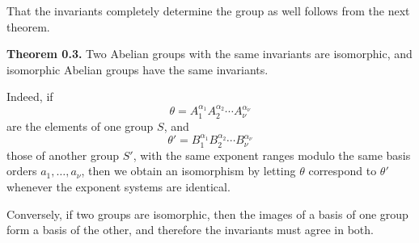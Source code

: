 \documentclass[11pt]{article}
\begin{document}
That the invariants completely determine the group as well follows from the next theorem.

\medskip
\noindent\textbf{Theorem 0.3.}
Two Abelian groups with the same invariants are isomorphic, and isomorphic Abelian groups have the same invariants.

\medskip
Indeed, if
\[
\theta=A_1^{\alpha_1}A_2^{\alpha_2}\cdots A_\nu^{\alpha_\nu}
\]
are the elements of one group \(S\), and
\[
\theta'=B_1^{\alpha_1}B_2^{\alpha_2}\cdots B_\nu^{\alpha_\nu}
\]
those of another group \(S'\), with the same exponent ranges modulo the same basis orders \(a_1,\dots,a_\nu\), then we obtain an isomorphism by letting \(\theta\) correspond to \(\theta'\) whenever the exponent systems are identical.

Conversely, if two groups are isomorphic, then the images of a basis of one group form a basis of the other, and therefore the invariants must agree in both.
\end{document}
